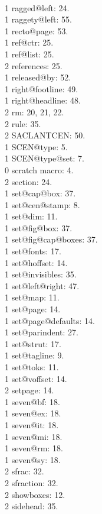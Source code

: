 \\1 ragged@left: 24.
\\1 raggety@left: 55.
\\1 recto@page: 53.
\\1 ref@ctr: 25.
\\1 ref@list: 25.
\\2 references: 25.
\\1 released@by: 52.
\\1 right@footline: 49.
\\1 right@headline: 48.
\\2 rm: 20, 21, 22.
\\2 rule: 35.
\\2 SACLANTCEN: 50.
\\1 SCEN@type: 5.
\\1 SCEN@type@set: 7.
\\0 scratch macro: 4.
\\2 section: 24.
\\1 set@cap@box: 37.
\\1 set@cen@stamp: 8.
\\1 set@dim: 11.
\\1 set@fig@box: 37.
\\1 set@fig@cap@boxes: 37.
\\1 set@fonts: 17.
\\1 set@hoffset: 14.
\\1 set@invisibles: 35.
\\1 set@left@right: 47.
\\1 set@map: 11.
\\1 set@page: 14.
\\1 set@page@defaults: 14.
\\1 set@parindent: 27.
\\1 set@strut: 17.
\\1 set@tagline: 9.
\\1 set@toks: 11.
\\1 set@voffset: 14.
\\2 setpage: 14.
\\1 seven@bf: 18.
\\1 seven@ex: 18.
\\1 seven@it: 18.
\\1 seven@mi: 18.
\\1 seven@rm: 18.
\\1 seven@sy: 18.
\\2 sfrac: 32.
\\2 sfraction: 32.
\\2 showboxes: 12.
\\2 sidehead: 35.
